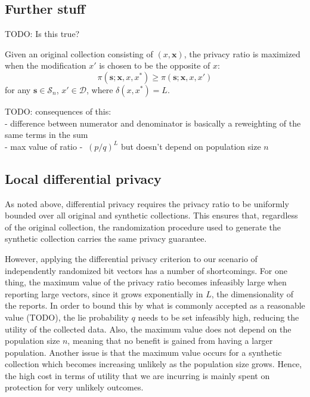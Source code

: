 \documentclass[11pt,draft]{article}
\newcommand{\Dsp}{\mathcal{D}}
\newcommand{\Ssp}{\mathcal{S}}
\newcommand{\xv}{\mathbf{x}}
\newcommand{\sv}{\mathbf{s}}
\begin{document}
\hrulefill

\subsection{Further stuff}

TODO: Is this true?

\begin{prop}
Given an original collection consisting of $(x, \xv)$, the privacy ratio is
maximized when the modification $x'$ is chosen to be the opposite of $x$:
\[ \pi(\sv; \xv, x, x^*) \geq \pi(\sv; \xv, x, x') \]
for any $\sv\in\Ssp_n$, $x'\in \Dsp$, where $\delta(x, x^*) = L$.
\end{prop}


TODO: consequences of this: \\
- difference between numerator and denominator is basically a reweighting of the same terms in the sum \\
- max value of ratio -  $~ (p/q)^L$ but doesn't depend on population size $n$

\subsection{Local differential privacy}

As noted above, differential privacy requires the privacy ratio to be uniformly
bounded over all original and synthetic collections.
This ensures that, regardless of the original collection, the randomization
procedure used to generate the synthetic collection carries the same privacy
guarantee.

However, applying the differential privacy criterion to our scenario of
independently randomized bit vectors has a number of shortcomings.
For one thing, the maximum value of the privacy ratio becomes infeasibly large
when reporting large vectors, since it grows exponentially in $L$, the
dimensionality of the reports.
In order to bound this by what is commonly accepted as a reasonable value
(TODO), the lie probability $q$ needs to be set infeasibly high, reducing the
utility of the collected data.
Also, the maximum value does not depend on the population size $n$, meaning
that no benefit is gained from having a larger population.
Another issue is that the maximum value occurs for a synthetic collection
which becomes increasing unlikely as the population size grows. Hence, the high
cost in terms of utility that we are incurring is mainly spent on protection
for very unlikely outcomes.
\end{document}
